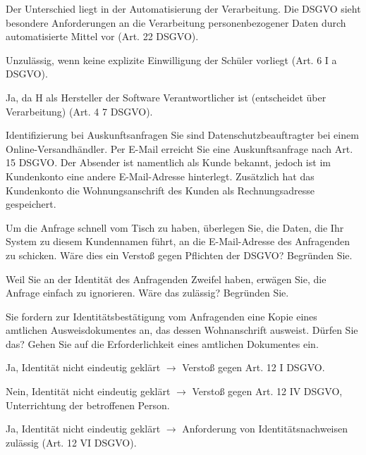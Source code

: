 \documentclass{exercisesheet}
\begin{document}
\begin{solutions}
  \item Der Unterschied liegt in der Automatisierung der Verarbeitung. Die DSGVO sieht besondere Anforderungen an die Verarbeitung personenbezogener Daten durch automatisierte Mittel vor (Art. 22 DSGVO).
  \item Unzulässig, wenn keine explizite Einwilligung der Schüler vorliegt (Art. 6 I a DSGVO).
  \item Ja, da H als Hersteller der Software Verantwortlicher ist (entscheidet über Verarbeitung) (Art. 4 7 DSGVO).
\end{solutions}

\begin{eexercises}{Identifizierung bei Auskunftsanfragen}{
    Sie sind Datenschutzbeauftragter bei einem Online-Versandhändler. Per E-Mail erreicht Sie eine Auskunftsanfrage nach Art. 15 DSGVO. Der Absender ist namentlich als Kunde bekannt, jedoch ist im Kundenkonto eine andere E-Mail-Adresse hinterlegt. Zusätzlich hat das Kundenkonto die Wohnungsanschrift des Kunden als Rechnungsadresse gespeichert.
  }
  \item Um die Anfrage schnell vom Tisch zu haben, überlegen Sie, die Daten, die Ihr System zu diesem Kundennamen führt, an die E-Mail-Adresse des Anfragenden zu schicken. Wäre dies ein Verstoß gegen Pflichten der DSGVO? Begründen Sie.
  \item Weil Sie an der Identität des Anfragenden Zweifel haben, erwägen Sie, die Anfrage einfach zu ignorieren. Wäre das zulässig? Begründen Sie.
  \item Sie fordern zur Identitätsbestätigung vom Anfragenden eine Kopie eines amtlichen Ausweisdokumentes an, das dessen Wohnanschrift ausweist. Dürfen Sie das? Gehen Sie auf die Erforderlichkeit eines amtlichen Dokumentes ein.
\end{eexercises}

\begin{solutions}
  \item Ja, Identität nicht eindeutig geklärt $\to$ Verstoß gegen Art. 12 I DSGVO.
  \item Nein, Identität nicht eindeutig geklärt $\to$ Verstoß gegen Art. 12 IV DSGVO, Unterrichtung der betroffenen Person.
  \item Ja, Identität nicht eindeutig geklärt $\to$ Anforderung von Identitätsnachweisen zulässig (Art. 12 VI DSGVO).
\end{solutions}
\end{document}
